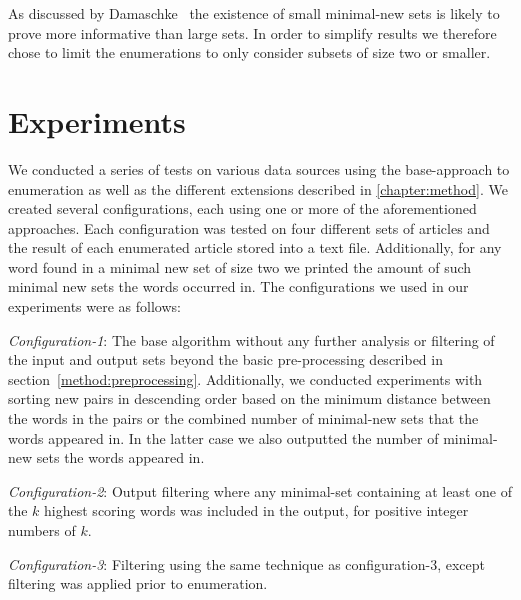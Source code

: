 As discussed by Damaschke~\cite{damaschke2015pairs} the existence of small minimal-new sets is likely to prove more informative than large sets. In order to simplify results we therefore chose to limit the enumerations to only consider subsets of size two or smaller.

\section{Experiments}
We conducted a series of tests on various data sources using the base-approach to enumeration as well as the different extensions described in \cref{chapter:method}. We created several configurations, each using one or more of the aforementioned approaches. Each configuration was tested on four different sets of articles and the result of each enumerated article stored into a text file. Additionally, for any word found in a minimal new set of size two we printed the amount of such minimal new sets the words occurred in. The configurations we used in our experiments were as follows:


\emph{Configuration-1}: The base algorithm without any further analysis or filtering of the input and output sets beyond the basic pre-processing described in section~\ref{method:preprocessing}. Additionally, we conducted experiments with sorting new pairs in descending order based on the minimum distance between the words in the pairs or the combined number of minimal-new sets that the words appeared in. In the latter case we also outputted the number of minimal-new sets the words appeared in.


\emph{Configuration-2}: Output filtering where any minimal-set containing at least one of the $k$ highest scoring words was included in the output, for positive integer numbers of $k$. 


\emph{Configuration-3}: Filtering using the same technique as configuration-3, except filtering was applied prior to enumeration.

